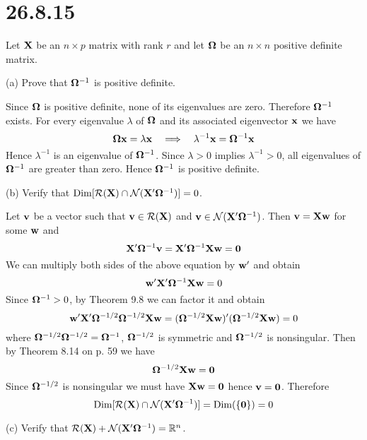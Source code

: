 \section*{26.8.15}
Let $\bf X$ be an $n\times p$ matrix with rank $r$ and let
$\bf\Omega$ be an $n\times n$ positive definite matrix.

\bigskip
\noindent
(a) Prove that ${\bf\Omega}^{-1}$ is positive definite.

\bigskip
\noindent
Since $\bf\Omega$ is positive definite,
none of its eigenvalues are zero.
Therefore ${\bf\Omega}^{-1}$ exists.
For every eigenvalue $\lambda$ of $\bf\Omega$ and its associated eigenvector $\bf x$
we have
$${\bf\Omega}{\bf x}=\lambda{\bf x}
\quad\Longrightarrow\quad
\lambda^{-1}{\bf x}={\bf\Omega}^{-1}{\bf x}
$$
Hence $\lambda^{-1}$ is an eigenvalue of ${\bf\Omega}^{-1}$.
Since $\lambda>0$ implies $\lambda^{-1}>0$, all eigenvalues
of ${\bf\Omega}^{-1}$ are greater than zero.
Hence ${\bf\Omega}^{-1}$ is positive definite.

\bigskip
\noindent
(b) Verify that
$\mathop{\rm Dim}[{\cal R}({\bf X})\cap
{\cal N}({\bf X}'{\bf\Omega}^{-1})]=0$.

\bigskip
\noindent
Let $\bf v$ be a vector such that ${\bf v}\in{\cal R}({\bf X})$ and
${\bf v}\in{\cal N}({\bf X}'{\bf\Omega}^{-1})$.
Then ${\bf v}={\bf Xw}$ for some $\bf w$
and
$${\bf X}'{\bf\Omega}^{-1}{\bf v}
={\bf X}'{\bf\Omega}^{-1}{\bf Xw}={\bf 0}$$
We can multiply both sides of the above equation by ${\bf w}'$
and obtain
$${\bf w}'{\bf X}'{\bf\Omega}^{-1}{\bf Xw}=0$$
Since ${\bf\Omega}^{-1}>0$, by Theorem 9.8 we can factor it and
obtain
$${\bf w}'{\bf X}'{\bf\Omega}^{-1/2}{\bf\Omega}^{-1/2}{\bf Xw}
=({\bf\Omega}^{-1/2}{\bf Xw})'({\bf\Omega}^{-1/2}{\bf Xw)}=0$$
where ${\bf\Omega}^{-1/2}{\bf\Omega}^{-1/2}={\bf\Omega}^{-1}$,
${\bf\Omega}^{-1/2}$ is symmetric and ${\bf\Omega}^{-1/2}$ is
nonsingular.
Then by Theorem 8.14 on p. 59 we have
$${\bf\Omega}^{-1/2}{\bf Xw}=\bf0$$
Since ${\bf\Omega}^{-1/2}$ is nonsingular
we must have ${\bf Xw}={\bf 0}$ hence ${\bf v}=\bf0$.
Therefore
$$\mathop{\rm Dim}[{\cal R}({\bf X})\cap
{\cal N}({\bf X}'{\bf\Omega}^{-1})]=\mathop{\rm Dim}(\{{\bf0}\})=0$$

\bigskip
\noindent
(c) Verify that
${\cal R}({\bf X})+{\cal N}({\bf X}'{\bf\Omega}^{-1})=\mathbb{R}^n$.

